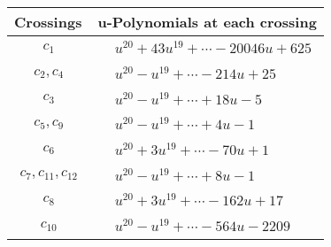 \documentclass[1p]{elsarticle_modified}
\theoremstyle{definition}
\begin{document}
\begin{tabular}{m{50pt}|m{274pt}}
Crossings & \hspace{64pt}u-Polynomials at each crossing \\
\hline $$\begin{aligned}c_{1}\end{aligned}$$&$\begin{aligned}
&u^{20}+43 u^{19}+\cdots-20046 u+625
\end{aligned}$\\
\hline $$\begin{aligned}c_{2},c_{4}\end{aligned}$$&$\begin{aligned}
&u^{20}- u^{19}+\cdots-214 u+25
\end{aligned}$\\
\hline $$\begin{aligned}c_{3}\end{aligned}$$&$\begin{aligned}
&u^{20}- u^{19}+\cdots+18 u-5
\end{aligned}$\\
\hline $$\begin{aligned}c_{5},c_{9}\end{aligned}$$&$\begin{aligned}
&u^{20}- u^{19}+\cdots+4 u-1
\end{aligned}$\\
\hline $$\begin{aligned}c_{6}\end{aligned}$$&$\begin{aligned}
&u^{20}+3 u^{19}+\cdots-70 u+1
\end{aligned}$\\
\hline $$\begin{aligned}c_{7},c_{11},c_{12}\end{aligned}$$&$\begin{aligned}
&u^{20}- u^{19}+\cdots+8 u-1
\end{aligned}$\\
\hline $$\begin{aligned}c_{8}\end{aligned}$$&$\begin{aligned}
&u^{20}+3 u^{19}+\cdots-162 u+17
\end{aligned}$\\
\hline $$\begin{aligned}c_{10}\end{aligned}$$&$\begin{aligned}
&u^{20}- u^{19}+\cdots-564 u-2209
\end{aligned}$\\
\hline
\end{tabular}\\~\\
\end{document}
